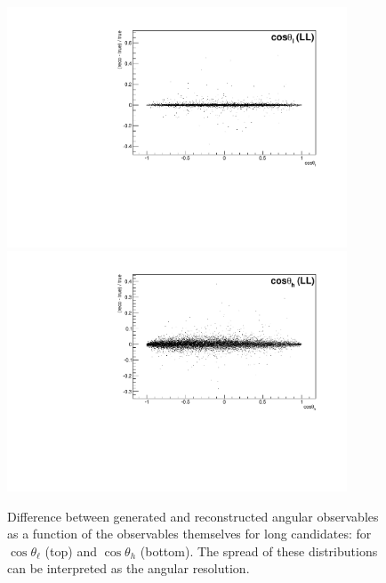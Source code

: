 \begin{figure}
\centering
\includegraphics[width=0.9\textwidth]{Lmumu/figs/resolution/RmT_vs_cosThetaL_LL.pdf}
\includegraphics[width=0.9\textwidth]{Lmumu/figs/resolution/RmT_vs_cosThetaB_LL.pdf}
 \caption{Difference between generated and reconstructed angular observables as a function of the 
 observables themselves for long candidates: for $\cos\theta_\ell$ (top) and $\cos\theta_h$ (bottom). 
 The spread of these distributions can be interpreted as the angular resolution.
 }
\label{fig:resolutionvsq2ang}
\end{figure}
